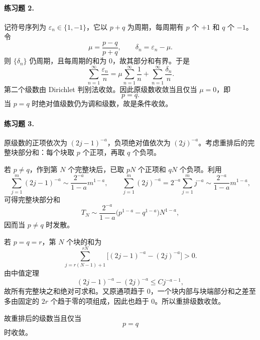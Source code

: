 \paragraph{练习题 2.}
\begin{xsolution}
记符号序列为 $\varepsilon_n\in\{1,-1\}$，它以 $p+q$ 为周期，每周期有 $p$ 个 $+1$ 和 $q$ 个 $-1$。令
\[
 \mu=\frac{p-q}{p+q},\qquad \delta_n=\varepsilon_n-\mu.
\]
则 $\{\delta_n\}$ 仍周期，且每周期的和为 $0$，故其部分和有界。于是
\[
 \sum_{n=1}^{\infty}\frac{\varepsilon_n}{n}
 =\mu\sum_{n=1}^{\infty}\frac1n
 +\sum_{n=1}^{\infty}\frac{\delta_n}{n}.
\]
第二个级数由 Dirichlet 判别法收敛。因此原级数收敛当且仅当 $\mu=0$，即
\[
 \boxed{p=q}.
\]
当 $p=q$ 时绝对值级数仍为调和级数，故是条件收敛。
\end{xsolution}

\paragraph{练习题 3.}
\begin{xsolution}
原级数的正项依次为 $(2j-1)^{-a}$，负项绝对值依次为 $(2j)^{-a}$。考虑重排后的完整块部分和：每个块取 $p$ 个正项，再取 $q$ 个负项。

若 $p\neq q$，作到第 $N$ 个完整块后，已取 $pN$ 个正项和 $qN$ 个负项。利用
\[
 \sum_{j=1}^{m}(2j-1)^{-a}\sim\frac{2^{-a}}{1-a}m^{1-a},
 \qquad
 \sum_{j=1}^{m}(2j)^{-a}=2^{-a}\sum_{j=1}^{m}j^{-a}\sim\frac{2^{-a}}{1-a}m^{1-a},
\]
可得完整块部分和
\[
 T_N\sim\frac{2^{-a}}{1-a}\bigl(p^{1-a}-q^{1-a}\bigr)N^{1-a},
\]
因而当 $p\neq q$ 时发散。

若 $p=q=r$，第 $N$ 个块的和为
\[
 \sum_{j=r(N-1)+1}^{rN}\bigl[(2j-1)^{-a}-(2j)^{-a}\bigr]>0.
\]
由中值定理
\[
 (2j-1)^{-a}-(2j)^{-a}\leq Cj^{-a-1},
\]
故所有完整块之和绝对可求和。又原通项趋于 $0$，一个块内部与块端部分和之差至多由固定的 $2r$ 个趋于零的项组成，因此也趋于 $0$。所以重排级数收敛。

故重排后的级数当且仅当
\[
 \boxed{p=q}
\]
时收敛。
\end{xsolution}

